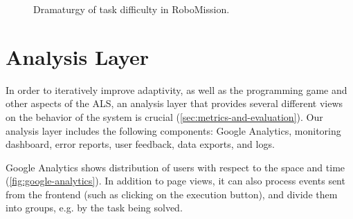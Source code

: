 \begin{figure}[htb]
\centering
{}
\caption{Dramaturgy of task difficulty in RoboMission.}
\label{fig:robomission.flow}
\end{figure}






\section{Analysis Layer}
\label{sec:robomission.analysis-layer}

In order to iteratively improve adaptivity, as well as the programming game
and other aspects of the ALS,
an analysis layer
that provides several different views on the behavior of the system
is crucial (\cref{sec:metrics-and-evaluation}).
Our analysis layer includes the following components:
Google Analytics, monitoring dashboard, error reports, user feedback,
data exports, and logs.

Google Analytics
  shows distribution of users with respect to the space and time
  (\cref{fig:google-analytics}).
  In addition to page views,
  it can also process events sent from the frontend
  (such as clicking on the execution button),
  and divide them into groups, e.g. by the task being solved.


